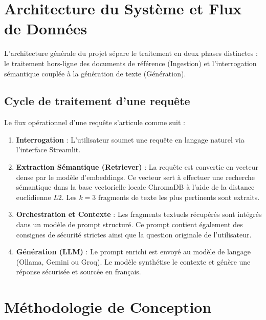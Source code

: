 \documentclass[12pt,a4paper]{article}
\begin{document}
\section{Architecture du Système et Flux de Données}
L'architecture générale du projet sépare le traitement en deux phases distinctes : le traitement hors-ligne des documents de référence (Ingestion) et l'interrogation sémantique couplée à la génération de texte (Génération).

\subsection{Cycle de traitement d'une requête}
Le flux opérationnel d'une requête s'articule comme suit :
\begin{enumerate}
    \item \textbf{Interrogation} : L'utilisateur soumet une requête en langage naturel via l'interface Streamlit.
    \item \textbf{Extraction Sémantique (Retriever)} : La requête est convertie en vecteur dense par le modèle d'embeddings. Ce vecteur sert à effectuer une recherche sémantique dans la base vectorielle locale ChromaDB à l'aide de la distance euclidienne $L2$. Les $k=3$ fragments de texte les plus pertinents sont extraits.
    \item \textbf{Orchestration et Contexte} : Les fragments textuels récupérés sont intégrés dans un modèle de prompt structuré. Ce prompt contient également des consignes de sécurité strictes ainsi que la question originale de l'utilisateur.
    \item \textbf{Génération (LLM)} : Le prompt enrichi est envoyé au modèle de langage (Ollama, Gemini ou Groq). Le modèle synthétise le contexte et génère une réponse sécurisée et sourcée en français.
\end{enumerate}

\section{Méthodologie de Conception}
\end{document}
